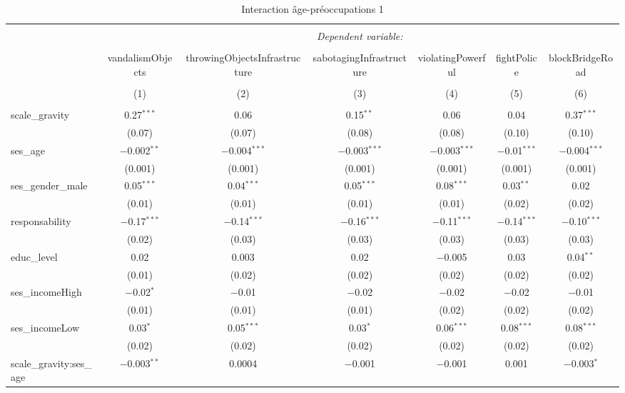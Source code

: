 \documentclass[
]{article}
\begin{document}
\begin{sidewaystable}[!htbp] \centering 
  \caption{Interaction âge-préoccupations 1} 
  \label{} 
\begin{tabular}{@{\extracolsep{1pt}}lcccccc} 
\\[-1.8ex]\hline 
\hline \\[-1.8ex] 
 & \multicolumn{6}{c}{\textit{Dependent variable:}} \\ 
\cline{2-7} 
\\[-1.8ex] & vandalismObjects & throwingObjectsInfrastructure & sabotagingInfrastructure & violatingPowerful & fightPolice & blockBridgeRoad \\ 
\\[-1.8ex] & (1) & (2) & (3) & (4) & (5) & (6)\\ 
\hline \\[-1.8ex] 
 scale\_gravity & 0.27$^{***}$ & 0.06 & 0.15$^{**}$ & 0.06 & 0.04 & 0.37$^{***}$ \\ 
  & (0.07) & (0.07) & (0.08) & (0.08) & (0.10) & (0.10) \\ 
  ses\_age & $-$0.002$^{**}$ & $-$0.004$^{***}$ & $-$0.003$^{***}$ & $-$0.003$^{***}$ & $-$0.01$^{***}$ & $-$0.004$^{***}$ \\ 
  & (0.001) & (0.001) & (0.001) & (0.001) & (0.001) & (0.001) \\ 
  ses\_gender\_male & 0.05$^{***}$ & 0.04$^{***}$ & 0.05$^{***}$ & 0.08$^{***}$ & 0.03$^{**}$ & 0.02 \\ 
  & (0.01) & (0.01) & (0.01) & (0.01) & (0.02) & (0.02) \\ 
  responsability & $-$0.17$^{***}$ & $-$0.14$^{***}$ & $-$0.16$^{***}$ & $-$0.11$^{***}$ & $-$0.14$^{***}$ & $-$0.10$^{***}$ \\ 
  & (0.02) & (0.03) & (0.03) & (0.03) & (0.03) & (0.03) \\ 
  educ\_level & 0.02 & 0.003 & 0.02 & $-$0.005 & 0.03 & 0.04$^{**}$ \\ 
  & (0.01) & (0.02) & (0.02) & (0.02) & (0.02) & (0.02) \\ 
  ses\_incomeHigh & $-$0.02$^{*}$ & $-$0.01 & $-$0.02 & $-$0.02 & $-$0.02 & $-$0.01 \\ 
  & (0.01) & (0.01) & (0.01) & (0.02) & (0.02) & (0.02) \\ 
  ses\_incomeLow & 0.03$^{*}$ & 0.05$^{***}$ & 0.03$^{*}$ & 0.06$^{***}$ & 0.08$^{***}$ & 0.08$^{***}$ \\ 
  & (0.02) & (0.02) & (0.02) & (0.02) & (0.02) & (0.02) \\ 
  scale\_gravity:ses\_age & $-$0.003$^{**}$ & 0.0004 & $-$0.001 & $-$0.001 & 0.001 & $-$0.003$^{*}$ \\ 

\end{tabular}
\end{sidewaystable}
\end{document}
